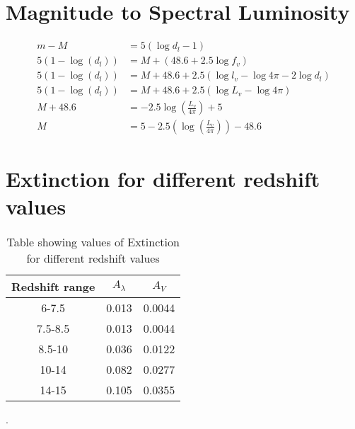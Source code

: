 \section{Magnitude to Spectral Luminosity} %
\label{sec:magnitude_to_spectral_luminosity}
	\begin{align}
		m-M &=5(\log d_l - 1)\\
		5(1-\log (d_l)) &= M + (48.6+2.5\log f_v) \\
		5(1-\log (d_l)) &= M + 48.6 + 2.5(\log l_v - \log 4\pi - 2 \log d_l) \\
		5(1-\log (d_l)) &= M+48.6 + 2.5(\log L_v - \log 4\pi) \\
		M+48.6 &=-2.5 \log (\frac{L_v}{4\pi})+5 \\
		M &=5-2.5(\log (\frac{L_v}{4\pi})) - 48.6
	\end{align}

\section{Extinction for different redshift values} %
\label{sec:extinction_for_different_redshift_values}
	\begin{table}[ht]
		\begin{center}
			\begin{tabular}{c|c|c}
				Redshift range & $A_\lambda$ & $A_V$  \\
				\hline \hline
				6-7.5	   &0.013&  0.0044 \\
				7.5-8.5&0.013&  0.0044 \\
				8.5-10 &0.036&  0.0122\\
				10-14  &0.082&  0.0277\\
				14-15  &0.105&  0.0355\\
			\end{tabular}
		\end{center}
		\caption{Table showing values of Extinction for different redshift values}
		\label{tab:extinction_values}
	\end{table}.

